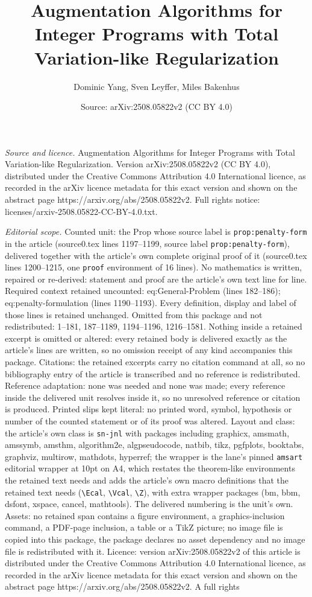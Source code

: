 \documentclass[10pt,a4paper]{amsart}
\title[Augmentation Algorithms for Integer Programs with Total Vari]{Augmentation Algorithms for Integer Programs with Total Variation-like Regularization}
\author{Dominic Yang, Sven Leyffer, Miles Bakenhus}
\date{Source: arXiv:2508.05822v2 (CC BY 4.0)}
\begin{document}
\maketitle

\noindent\emph{Source and licence.} Augmentation Algorithms for Integer Programs with Total Variation-like Regularization. Version arXiv:2508.05822v2 (CC BY 4.0), distributed under the Creative Commons Attribution 4.0 International licence, as recorded in the arXiv licence metadata for this exact version and shown on the abstract page https://arxiv.org/abs/2508.05822v2. Full rights notice: licenses/arxiv-2508.05822-CC-BY-4.0.txt.\par\smallskip

\noindent\textit{Editorial scope.} Counted unit: the Prop whose source label is \texttt{prop:penalty-form} in the article (source0.tex lines 1197--1199, source label \texttt{prop:penalty-form}), delivered together with the article's own complete original proof of it (source0.tex lines 1200--1215, one \texttt{proof} environment of 16 lines). No mathematics is written, repaired or re-derived: statement and proof are the article's own text line for line. Required context retained uncounted: eq:General-Problem (lines 182--186); eq:penalty-formulation (lines 1190--1193). Every definition, display and label of those lines is retained unchanged. Omitted from this package and not redistributed: 1--181, 187--1189, 1194--1196, 1216--1581. Nothing inside a retained excerpt is omitted or altered: every retained body is delivered exactly as the article's lines are written, so no omission receipt of any kind accompanies this package. Citations: the retained excerpts carry no citation command at all, so no bibliography entry of the article is transcribed and no reference is redistributed. Reference adaptation: none was needed and none was made; every reference inside the delivered unit resolves inside it, so no unresolved reference or citation is produced. Printed slips kept literal: no printed word, symbol, hypothesis or number of the counted statement or of its proof was altered. Layout and class: the article's own class is \texttt{sn-jnl} with packages including graphicx, amsmath, amssymb, amsthm, algorithm2e, algpseudocode, natbib, tikz, pgfplots, booktabs, graphviz, multirow, mathdots, hyperref; the wrapper is the lane's pinned \texttt{amsart} editorial wrapper at 10pt on A4, which restates the theorem-like environments the retained text needs and adds the article's own macro definitions that the retained text needs (\texttt{\textbackslash Ecal}, \texttt{\textbackslash Vcal}, \texttt{\textbackslash Z}), with extra wrapper packages (bm, bbm, dsfont, xspace, cancel, mathtools). The delivered numbering is the unit's own. Assets: no retained span contains a figure environment, a graphics-inclusion command, a PDF-page inclusion, a table or a TikZ picture; no image file is copied into this package, the package declares no asset dependency and no image file is redistributed with it. Licence: version arXiv:2508.05822v2 of this article is distributed under the Creative Commons Attribution 4.0 International licence, as recorded in the arXiv licence metadata for this exact version and shown on the abstract page https://arxiv.org/abs/2508.05822v2. A full rights 
\end{document}
